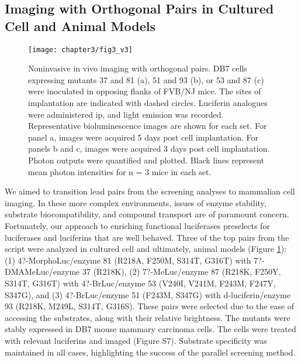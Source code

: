 \subsection*{Imaging with Orthogonal Pairs in Cultured Cell and Animal Models}
\begin{figure}[htbp]
\texttt{[image: chapter3/fig3\_v3]}
\centering
\caption[Noninvasive in vivo imaging with orthogonal pairs]{Noninvasive in vivo imaging with orthogonal pairs. DB7 cells expressing mutants 37 and 81 (a), 51 and 93 (b), or 53 and 87 (c) were inoculated in opposing flanks of FVB/NJ mice. The sites of implantation are indicated with dashed circles. Luciferin analogues were administered ip, and light emission was recorded. Representative bioluminescence images are shown for each set. For panel a, images were acquired 5 days post cell implantation. For panels b and c, images were acquired 3 days post cell implantation. Photon outputs were quantified and plotted. Black lines represent mean photon intensities for n = 3 mice in each set.}
  \label{fig:inVivo}
\end{figure}
We aimed to transition lead pairs from the screening analyses to mammalian cell imaging. In these more complex environments, issues of enzyme stability, substrate biocompatibility, and compound transport are of paramount concern. Fortunately, our approach to enriching functional luciferases preselects for luciferases and luciferins that are well behaved. Three of the top pairs from the script were analyzed in cultured cell
and ultimately, animal models (Figure \ref{fig:inVivo}): (1) 4?-MorphoLuc/enzyme 81 (R218A, F250M, S314T, G316T) with 7?-DMAMeLuc/enzyme 37 (R218K), (2) 7?-MeLuc/enzyme 87 (R218K, F250Y, S314T, G316T) with 4?-BrLuc/enzyme 53 (V240I, V241M, F243M, F247Y, S347G), and (3) 4?-BrLuc/enzyme 51 (F243M, S347G) with d-luciferin/enzyme 93 (R218K, M249L, S314T, G316S). These pairs were selected due to the ease of accessing the substrates, along with their relative brightness. The mutants were stably expressed in DB7 mouse mammary carcinoma cells. The cells were treated with relevant luciferins and imaged (Figure S7). Substrate specificity was maintained in all cases, highlighting the success of the parallel screening method.
\par
